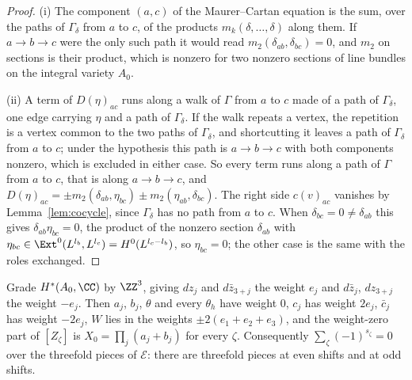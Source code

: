 \begin{proof}
(i) The component $(a,c)$ of the Maurer--Cartan equation is the sum, over the paths of $\Gamma_{\delta}$ from $a$ to $c$, of the products $m_{k}(\delta,\dots,\delta)$ along them. If $a\to b\to c$ were the only such path it would read $m_{2}(\delta_{ab},\delta_{bc})=0$, and $m_{2}$ on sections is their product, which is nonzero for two nonzero sections of line bundles on the integral variety $A_{0}$.

(ii) A term of $D(\eta)_{ac}$ runs along a walk of $\Gamma$ from $a$ to $c$ made of a path of $\Gamma_{\delta}$, one edge carrying $\eta$ and a path of $\Gamma_{\delta}$. If the walk repeats a vertex, the repetition is a vertex common to the two paths of $\Gamma_{\delta}$, and shortcutting it leaves a path of $\Gamma_{\delta}$ from $a$ to $c$; under the hypothesis this path is $a\to b\to c$ with both components nonzero, which is excluded in either case. So every term runs along a path of $\Gamma$ from $a$ to $c$, that is along $a\to b\to c$, and $D(\eta)_{ac}=\pm m_{2}(\delta_{ab},\eta_{bc})\pm m_{2}(\eta_{ab},\delta_{bc})$. The right side $c(v)_{ac}$ vanishes by Lemma~\ref{lem:cocycle}, since $\Gamma_{\delta}$ has no path from $a$ to $c$. When $\delta_{bc}=0\ne\delta_{ab}$ this gives $\delta_{ab}\eta_{bc}=0$, the product of the nonzero section $\delta_{ab}$ with $\eta_{bc}\in\Ext^{0}(L^{l_{b}},L^{l_{c}})=H^{0}(L^{l_{c}-l_{b}})$, so $\eta_{bc}=0$; the other case is the same with the roles exchanged.
\end{proof}

\begin{lemma}\label{lem:parity}
Grade $H^{*}(A_{0},\CC)$ by $\ZZ^{3}$, giving $dz_{j}$ and $d\bar z_{3+j}$ the weight $e_{j}$ and $d\bar z_{j}$, $dz_{3+j}$ the weight $-e_{j}$. Then $a_{j}$, $b_{j}$, $\theta$ and every $\theta_{h}$ have weight $0$, $c_{j}$ has weight $2e_{j}$, $\bar c_{j}$ has weight $-2e_{j}$, $W$ lies in the weights $\pm2(e_{1}+e_{2}+e_{3})$, and the weight-zero part of $[Z_{\zeta}]$ is $X_{0}=\prod_{j}(a_{j}+b_{j})$ for every $\zeta$. Consequently $\sum_{\zeta}(-1)^{s_{\zeta}}=0$ over the threefold pieces of $\mathcal{E}$: there are threefold pieces at even shifts and at odd shifts.
\end{lemma}

